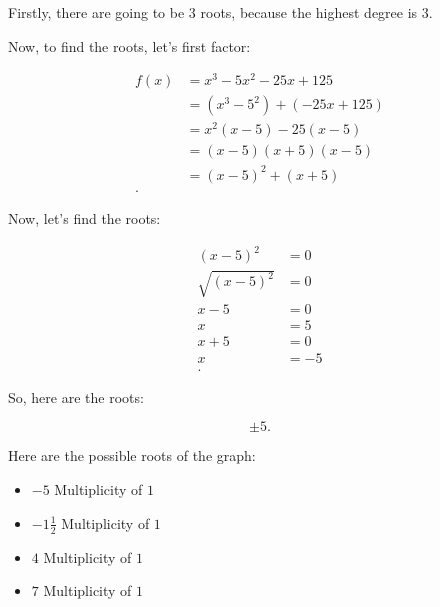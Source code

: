 \begin{question}[determine how many, what type, and find the roots for: \\
  $f(x) = x^3 - 5x^2 - 25x + 125$]

  Firstly, there are going to be $3$ roots, because the highest degree is $3$.

  Now, to find the roots, let's first factor:

  \begin{align}
    f(x)  &= x^3 - 5x^2 - 25x + 125 \\
          &= (x^3 - 5^2) + (-25x + 125) \\
          &= x^2(x - 5) - 25(x - 5) \\
          &= (x - 5)(x + 5)(x - 5) \\
          &= (x - 5)^2 + (x + 5) \\
  .\end{align}

  Now, let's find the roots:

  \begin{align}
    (x - 5)^2       &= 0 \\
    \sqrt{(x - 5)^2}    &= 0 \\
    x - 5          &= 0 \\
    x              &= 5 \\
    x + 5          &= 0 \\
    x              &= -5 \\
  .\end{align}

  So, here are the roots:

  \[ \pm 5 .\]
\end{question}

\begin{question}

  Here are the possible roots of the graph:

  \begin{itemize}
    \item $-5$ Multiplicity of $1$
    \item $-1 \frac{1}{2}$ Multiplicity of $1$
    \item $4$ Multiplicity of $1$
    \item $7$ Multiplicity of $1$
  \end{itemize}
\end{question}

